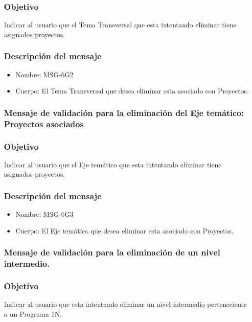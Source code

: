  \subsubsection{Objetivo}
 Indicar al usuario que el Tema Transversal que esta intentando eliminar tiene asignados proyectos.

 \subsubsection{Descripción del mensaje}
 \begin{itemize}
 \item Nombre: MSG-6G2
 \item Cuerpo: El Tema Transversal que desea eliminar esta asociado con Proyectos.
 \end{itemize}


\subsubsection{Mensaje de validación para la eliminación del Eje temático: Proyectos asociados} \label{MSG-6G3}
 
 \subsubsection{Objetivo}
 Indicar al usuario que el Eje temático que esta intentando eliminar tiene asignados proyectos.

 \subsubsection{Descripción del mensaje}
 \begin{itemize}
 \item Nombre: MSG-6G3
 \item Cuerpo: El Eje temático que desea eliminar esta asociado con Proyectos.
 \end{itemize}

\subsubsection{Mensaje de validación para la eliminación de un nivel intermedio.}\label{MSG-6D1}

\subsubsection{Objetivo}
Indicar al usuario que esta intentando eliminar un nivel intermedio perteneciente a un Programa 1N.

